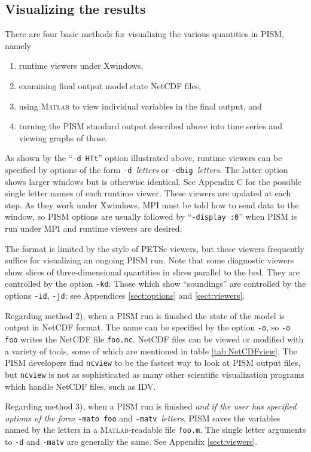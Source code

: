 \documentclass[11pt,final]{amsart}
\renewcommand{\t}[1]{\texttt{#1}}
\newcommand{\Matlab}{\textsc{Matlab}\xspace}
\begin{document}
\subsection{Visualizing the results}  There are four basic methods for visualizing the various quantities in PISM, namely \renewcommand{\labelenumi}{\arabic{enumi})~}  \begin{enumerate}
\item runtime viewers under Xwindows, 
\item examining final output model state NetCDF files, 
\item using \Matlab to view individual variables in the final output, and 
\item turning the PISM standard output described above into time series and viewing graphs of those.
\end{enumerate}

As shown by the ``\verb|-d HTt|'' option illustrated above, runtime viewers can be specified by options of the form \verb|-d |\emph{letters} or \verb|-dbig |\emph{letters}.  The latter option shows larger windows but is otherwise identical.  See Appendix C for the possible single letter names of each runtime viewer.  These viewers are updated at each step.  As they work under Xwindows, MPI must be told how to send data to the window, so PISM options are usually followed by ``\verb|-display :0|'' when PISM is run under MPI and runtime viewers are desired.

The format is limited by the style of PETSc viewers, but these viewers frequently suffice for visualizing an ongoing PISM run.  Note that some diagnostic viewers show slices of three-dimensional quantities in slices parallel to the bed.  They are controlled by the option \verb|-kd|.  Those which show ``soundings'' are controlled by the options \verb|-id|, \verb|-jd|; see Appendices \ref{sect:options} and \ref{sect:viewers}.

Regarding method 2), when a PISM run is finished the state of the model is output in NetCDF format.  The name can be specified by the option \verb|-o|, so \verb|-o foo| writes the NetCDF file \verb|foo.nc|.  NetCDF files can be viewed or modified with a variety of tools, some of which are mentioned in table \ref{tab:NetCDFview}.  The PISM developers find \t{ncview} to be the fastest way to look at PISM output files, but \verb|ncview| is not as sophisticated as many other scientific visualization programs which handle NetCDF files, such as IDV.

Regarding method 3), when a PISM run is finished \emph{and if the user has specified options of the form} \verb|-mato foo| and \verb|-matv |\emph{letters}, PISM saves the variables named by the letters in a \Matlab-readable file \verb|foo.m|.  The single letter arguments to \verb|-d| and \verb|-matv| are generally the same.  See Appendix \ref{sect:viewers}.
\end{document}
